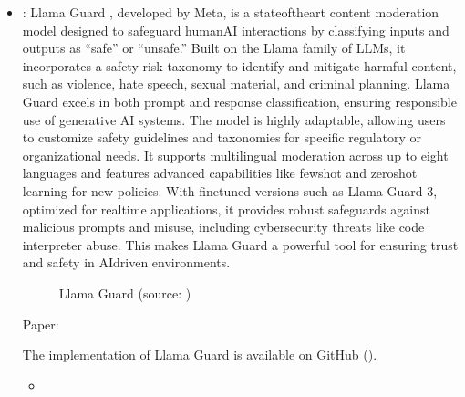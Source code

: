\documentclass[letterpaper,11pt,english]{sphinxmanual}
\begin{document}
\begin{itemize}
\item {} 
\sphinxAtStartPar
{}: Llama Guard , developed by Meta, is a state\sphinxhyphen{}of\sphinxhyphen{}the\sphinxhyphen{}art
content moderation model designed to safeguard human\sphinxhyphen{}AI interactions
by classifying inputs and outputs as “safe” or “unsafe.” Built on the
Llama family of LLMs, it incorporates a safety risk taxonomy to
identify and mitigate harmful content, such as violence, hate speech,
sexual material, and criminal planning. Llama Guard excels in both
prompt and response classification, ensuring responsible use of
generative AI systems. The model is highly adaptable, allowing users
to customize safety guidelines and taxonomies for specific regulatory
or organizational needs. It supports multilingual moderation across up
to eight languages and features advanced capabilities like few\sphinxhyphen{}shot
and zero\sphinxhyphen{}shot learning for new policies. With fine\sphinxhyphen{}tuned versions such
as Llama Guard 3, optimized for real\sphinxhyphen{}time applications, it provides
robust safeguards against malicious prompts and misuse, including
cybersecurity threats like code interpreter abuse. This makes Llama
Guard a powerful tool for ensuring trust and safety in AI\sphinxhyphen{}driven
environments.

\begin{figure}[htbp]
\centering
\capstart

\noindent{}
\caption{Llama Guard (source: )}\label{\detokenize{guardrails:id10}}\end{figure}

\sphinxAtStartPar
Paper: 

\sphinxAtStartPar
The implementation of Llama Guard is available on GitHub ().
\begin{description}
\begin{itemize}
\item {} 
\sphinxAtStartPar
{}


\end{itemize}
\end{description}
\end{itemize}
\end{document}
